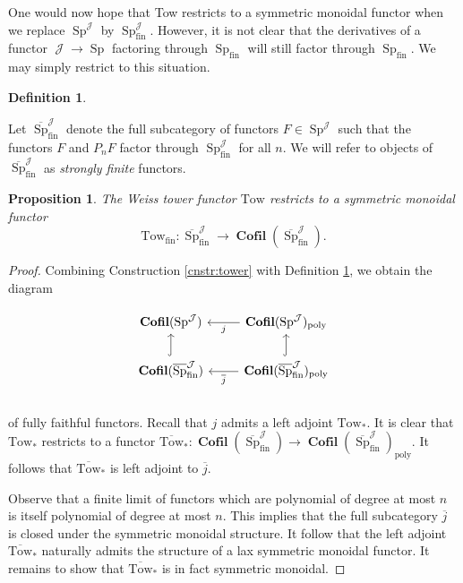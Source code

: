 \documentclass[reqno, oneside]{amsart}
\theoremstyle{definition}
\newtheorem{dfn}[nul]{Definition}
\theoremstyle{plain}
\newtheorem{prop}[nul]{Proposition}
\DeclareMathOperator{\fin}{\text{fin}}
\DeclareMathOperator{\Sp}{\text{Sp}}
\DeclareMathOperator{\J}{\mathcal{J}}
\DeclareMathOperator{\Cofil}{\textbf{Cofil}}
\begin{document}
One would now hope that Tow restricts to a symmetric monoidal functor when we replace $\Sp^{\J}$ by $\Sp^{\J}_{\fin}.$  However, it is not clear that the derivatives of a functor $\J \to \Sp$ factoring through $\Sp_{\fin}$ will still factor through $\Sp_{\fin}.$  We may simply restrict to this situation.  

\begin{dfn} \label{dfn:stronglyfinite}

Let $\overline{\Sp}^{\J}_{\fin}$ denote the full subcategory of functors $F\in \Sp^{\J}$ such that the functors $F$ and $P_nF$ factor through $\Sp_{\fin}^{\J}$ for all $n$.  We will refer to objects of $\overline{\Sp}^{\J}_{\fin}$ as \emph{strongly finite} functors.  
\end{dfn}

\begin{prop}\label{prop:weissmonoidal}
The Weiss tower functor $\text{Tow}$ restricts to a symmetric monoidal functor $$\text{Tow}_{\text{fin}}: \overline{\Sp}^{\J}_{\fin} \to \Cofil(\overline{\Sp}^{\J}_{\fin}).$$
\end{prop}
\begin{proof}
Combining Construction \ref{cnstr:tower} with Definition \ref{dfn:stronglyfinite}, we obtain the diagram

$$
\begin{tikzcd}
 \Cofil(\Sp^{\J})  &\Cofil(\Sp^{\J})_{\text{poly}} \arrow[l,"j"]  \\
 \Cofil(\overline{\Sp}^{\J}_{\fin}) \arrow[u,hook] &  \Cofil(\overline{\Sp}^{\J}_{\fin})_{\text{poly}} \arrow[l,"\overline{j}"]  \arrow[u,hook]\\
 \end{tikzcd}
$$
of fully faithful functors.  Recall that $j$ admits a left adjoint $\text{Tow}_*.$  It is clear that $\text{Tow}_*$ restricts to a functor $\overline{\text{Tow}}_*:  \Cofil(\overline{\Sp}^{\J}_{\fin}) \to  \Cofil(\overline{\Sp}^{\J}_{\fin})_{\text{poly}}.$  It follows that $\overline{\text{Tow}}_*$ is left adjoint to $\overline{j}.$  

Observe that a finite limit of functors which are polynomial of degree at most $n$ is itself polynomial of degree at most $n$.  This implies that the full subcategory $\overline{j}$ is closed under the symmetric monoidal structure.  It follow that the left adjoint $\overline{\text{Tow}}_*$ naturally admits the structure of a lax symmetric monoidal functor.  It remains to show that $\overline{\text{Tow}}_*$ is in fact symmetric monoidal.  


\end{proof}
\end{document}
